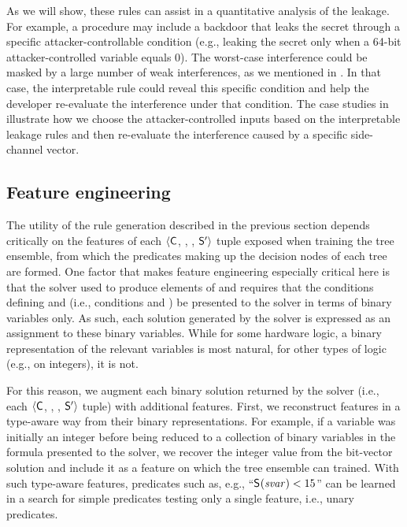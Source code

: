 As we will show, these rules can assist in a quantitative analysis of
the leakage.  For example, a procedure may include a backdoor that
leaks the secret through a specific attacker-controllable condition
(e.g., leaking the secret only when a 64-bit attacker-controlled
variable equals 0). The worst-case interference could be masked by a
large number of weak interferences, as we mentioned in
.  In that case, the interpretable rule
could reveal this specific condition and help the developer
re-evaluate the interference under that condition. The case studies in
 illustrate how
we choose the attacker-controlled inputs based on the interpretable
leakage rules and then re-evaluate the interference caused by a
specific side-channel vector.


\subsection{Feature engineering}
\label{dinome:sec:interpret:features}

The utility of the rule generation described in the previous section
depends critically on the features of each $\langle\mathsf{C}_{}$,
\AIIFn{}, \SecFn{}, $\mathsf{S}'_{}\rangle$ tuple exposed when training
the tree ensemble, from which the predicates making up the decision
nodes of each tree are formed.  One factor that makes feature
engineering especially critical here is that the \sat solver used to
produce elements of \interferenceSetSamples and
\noninterferenceSetSamples requires that the conditions defining
\interferenceSet and \noninterferenceSet (i.e., conditions
 and )
be presented to the \sat solver in terms of binary variables only.  As
such, each solution generated by the \sat solver is expressed as an
assignment to these binary variables.  While for some hardware logic,
a binary representation of the relevant variables is most natural, for
other types of logic (e.g., on integers), it is not.

For this reason, we augment each binary solution returned by the \sat
solver (i.e., each $\langle\mathsf{C}_{}$, \AIIFn{}, \SecFn{},
$\mathsf{S}'_{}\rangle$ tuple) with additional features.  First, we
reconstruct features in a type-aware way from their binary
representations.  For example, if a variable was initially an integer
before being reduced to a collection of binary variables in the
formula presented to the \sat solver, we recover the integer value
from the bit-vector solution and include it as a feature on which the
tree ensemble can trained.  With such type-aware features, predicates
such as, e.g., ``$\mathsf{S}_{}(\mathit{svar})<15$'' can be learned in a
search for simple predicates testing only a single feature, i.e.,
unary predicates.

